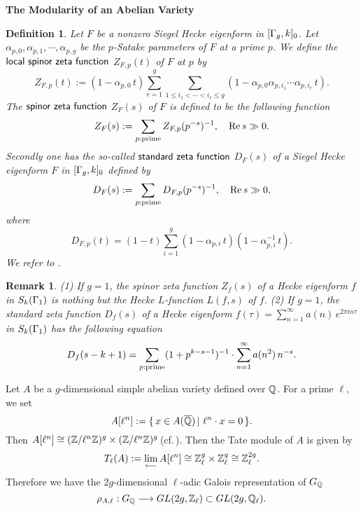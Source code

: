 \documentclass[11pt]{amsart}
\newtheorem{remark}[theorem]{Remark}
\newtheorem{definition}[theorem]{Definition}
\begin{document}
\begin{section}{{\bf The Modularity of an Abelian Variety}}
\begin{definition}\label{def:2.2}
Let $F$ be a nonzero Siegel Hecke eigenform in $[\Gamma_g,k]_0$. Let
$\alpha_{p,0},\alpha_{p,1},\cdots,\alpha_{p,g}$ be the $p$-Satake parameters of $F$ at
a prime $p$. We define the $\sf{local\ spinor\ zeta\ function}$ $Z_{F,p}(t)$ of $F$ at $p$
by
$$
Z_{F,p}(t):=(1-\alpha_{p,0}\,t)\sum_{r=1}^g\sum_{1\leq i_1<\cdots < i_r\leq g}
(1-\alpha_{p,0}\alpha_{p,i_1}\cdots\alpha_{p,i_r}\,t).
$$
The $\sf{spinor\ zeta\ function}$ $Z_{F}(s)$ of $F$ is defined to be the following function
\begin{equation*}
Z_{F}(s):=\sum_{p:{\rm prime}} Z_{F,p}(p^{-s})^{-1},\quad {\rm Re}\,s \gg 0.
\end{equation*}
Secondly one has the so-called $\sf{standard\ zeta\ function}$ $D_{F}(s)$ of a Siegel Hecke
eigenform $F$ in $[\Gamma_g,k]_0$ defined by
\begin{equation*}
D_{F}(s):=\sum_{p:{\rm prime}} D_{F,p}(p^{-s})^{-1},\quad {\rm Re}\,s \gg 0,
\end{equation*}
where
$$
D_{F,p}(t)=(1-t) \sum_{i=1}^g (1-\alpha_{p,i}\,t)(1-\alpha_{p,i}^{-1}\,t).
$$
We refer to \cite[p.\,249]{Y}.
\end{definition}

\begin{remark}\label{rk:2.3}
(1) If $g=1$, the spinor zeta function $Z_f(s)$ of a Hecke eigenform $f$ in $S_k(\Gamma_1)$
is nothing but the Hecke $L$-function $L(f,s)$ of $f$.
\vskip 2mm\noindent
(2) If $g=1$, the standard zeta function $D_f(s)$ of a Hecke eigenform
$f(\tau)=\sum_{n=1}^{\infty} a(n)\,e^{2\pi i n\tau}$ in $S_k(\Gamma_1)$ has the following equation
$$
D_f(s-k+1)=\sum_{p:{\rm prime}}(1+p^{k-s-1})^{-1}\cdot\sum_{n=1}^{\infty} a(n^2)\,n^{-s}.
$$
\end{remark}

\vskip 3mm
Let $A$ be a $g$-dimensional simple abelian variety defined over $\mathbb Q$. For a prime $\ell$, we set
\begin{equation*}
  A[\ell^n]:=\{ \, x\in A(\overline{\mathbb Q})\,|\ \ell^n\cdot x=0\,\}.
\end{equation*}
Then $A[\ell^n]\cong (\mathbb Z/\ell^n \mathbb Z)^g\times (\mathbb Z/\ell^n \mathbb Z)^g$\,(cf.\,\cite{MU}). Then the
Tate module of $A$ is given by
\begin{equation*}
  T_{\ell}(A):=\lim_{\longleftarrow} A[\ell^n]\cong \mathbb Z_\ell^g\times \mathbb Z_\ell^g
  \cong \mathbb Z_{\ell}^{2g}.
\end{equation*}
Therefore we have the $2g$-dimensional $\ell$-adic Galois representation of $G_\mathbb Q$
\begin{equation*}
\rho_{A,\ell}:G_\mathbb Q\longrightarrow GL(2g,\mathbb Z_\ell)\subset GL(2g,\mathbb Q_\ell).
\end{equation*}


\end{section}
\end{document}
